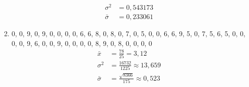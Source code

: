 \documentclass[11pt,answers]{exam}
\begin{document}
\begin{questions}
\begin{solution}
\begin{enumerate}
\begin{align*}
\\
\sigma^2&=0,543173
\\
\bar \sigma&=0,233061
\end{align*}
\item {0, 0, 9, 0, 9, 0, 0, 0, 0, 6, 6, 8, 0, 8, 0, 7, 0, 5, 0, 0, 6, 6, 9,
5, 0, 7, 5, 6, 5, 0, 0, 0, 0, 9, 6, 0, 0, 9, 0, 0, 0, 0, 8, 9, 0, 8,
0, 0, 0, 0}
\begin{align*}
\bar x&=\frac{78}{25}=3,12
\\
\sigma^2&=\frac{16732}{1225}\approx 13,659
\\
\bar \sigma&=\frac{\sqrt{8366}}{175}\approx 0,523
\end{align*}
\end{enumerate}
\end{solution}





\end{questions}
\end{document}
